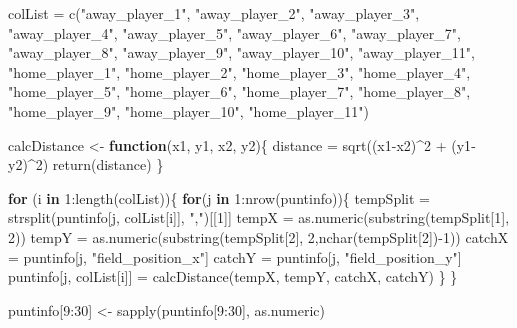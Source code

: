 \documentclass[
]{article}
\newenvironment{Shaded}{\begin{snugshade}}{\end{snugshade}}
\newcommand{\ControlFlowTok}[1]{\textcolor[rgb]{0.13,0.29,0.53}{\textbf{#1}}}
\newcommand{\DecValTok}[1]{\textcolor[rgb]{0.00,0.00,0.81}{#1}}
\newcommand{\FunctionTok}[1]{\textcolor[rgb]{0.00,0.00,0.00}{#1}}
\newcommand{\NormalTok}[1]{#1}
\newcommand{\OtherTok}[1]{\textcolor[rgb]{0.56,0.35,0.01}{#1}}
\newcommand{\SpecialCharTok}[1]{\textcolor[rgb]{0.00,0.00,0.00}{#1}}
\newcommand{\StringTok}[1]{\textcolor[rgb]{0.31,0.60,0.02}{#1}}
\begin{document}
\begin{Shaded}
\begin{Highlighting}[]
\NormalTok{colList }\OtherTok{=} \FunctionTok{c}\NormalTok{(}\StringTok{"away\_player\_1"}\NormalTok{, }\StringTok{"away\_player\_2"}\NormalTok{, }\StringTok{"away\_player\_3"}\NormalTok{, }\StringTok{"away\_player\_4"}\NormalTok{, }\StringTok{"away\_player\_5"}\NormalTok{, }\StringTok{"away\_player\_6"}\NormalTok{, }\StringTok{"away\_player\_7"}\NormalTok{, }\StringTok{"away\_player\_8"}\NormalTok{, }\StringTok{"away\_player\_9"}\NormalTok{, }\StringTok{"away\_player\_10"}\NormalTok{, }\StringTok{"away\_player\_11"}\NormalTok{, }\StringTok{"home\_player\_1"}\NormalTok{, }\StringTok{"home\_player\_2"}\NormalTok{, }\StringTok{"home\_player\_3"}\NormalTok{, }\StringTok{"home\_player\_4"}\NormalTok{, }\StringTok{"home\_player\_5"}\NormalTok{, }\StringTok{"home\_player\_6"}\NormalTok{, }\StringTok{"home\_player\_7"}\NormalTok{, }\StringTok{"home\_player\_8"}\NormalTok{, }\StringTok{"home\_player\_9"}\NormalTok{, }\StringTok{"home\_player\_10"}\NormalTok{, }\StringTok{"home\_player\_11"}\NormalTok{)}

\NormalTok{calcDistance }\OtherTok{\textless{}{-}} \ControlFlowTok{function}\NormalTok{(x1, y1, x2, y2)\{}
\NormalTok{  distance }\OtherTok{=} \FunctionTok{sqrt}\NormalTok{((x1}\SpecialCharTok{{-}}\NormalTok{x2)}\SpecialCharTok{\^{}}\DecValTok{2} \SpecialCharTok{+}\NormalTok{ (y1}\SpecialCharTok{{-}}\NormalTok{y2)}\SpecialCharTok{\^{}}\DecValTok{2}\NormalTok{)}
  \FunctionTok{return}\NormalTok{(distance)}
\NormalTok{\}}

\ControlFlowTok{for}\NormalTok{ (i }\ControlFlowTok{in} \DecValTok{1}\SpecialCharTok{:}\FunctionTok{length}\NormalTok{(colList))\{}
  \ControlFlowTok{for}\NormalTok{(j }\ControlFlowTok{in} \DecValTok{1}\SpecialCharTok{:}\FunctionTok{nrow}\NormalTok{(puntinfo))\{}
\NormalTok{    tempSplit }\OtherTok{=} \FunctionTok{strsplit}\NormalTok{(puntinfo[j, colList[i]], }\StringTok{","}\NormalTok{)[[}\DecValTok{1}\NormalTok{]]}
\NormalTok{    tempX }\OtherTok{=} \FunctionTok{as.numeric}\NormalTok{(}\FunctionTok{substring}\NormalTok{(tempSplit[}\DecValTok{1}\NormalTok{], }\DecValTok{2}\NormalTok{))}
\NormalTok{    tempY }\OtherTok{=} \FunctionTok{as.numeric}\NormalTok{(}\FunctionTok{substring}\NormalTok{(tempSplit[}\DecValTok{2}\NormalTok{], }\DecValTok{2}\NormalTok{,}\FunctionTok{nchar}\NormalTok{(tempSplit[}\DecValTok{2}\NormalTok{])}\SpecialCharTok{{-}}\DecValTok{1}\NormalTok{))}
\NormalTok{    catchX }\OtherTok{=}\NormalTok{ puntinfo[j, }\StringTok{"field\_position\_x"}\NormalTok{]}
\NormalTok{    catchY }\OtherTok{=}\NormalTok{ puntinfo[j, }\StringTok{"field\_position\_y"}\NormalTok{]}
\NormalTok{    puntinfo[j, colList[i]] }\OtherTok{=} \FunctionTok{calcDistance}\NormalTok{(tempX, tempY, catchX, catchY)}
\NormalTok{  \}}
\NormalTok{\}}

\NormalTok{puntinfo[}\DecValTok{9}\SpecialCharTok{:}\DecValTok{30}\NormalTok{] }\OtherTok{\textless{}{-}} \FunctionTok{sapply}\NormalTok{(puntinfo[}\DecValTok{9}\SpecialCharTok{:}\DecValTok{30}\NormalTok{], as.numeric)}
\end{Highlighting}
\end{Shaded}
\end{document}
